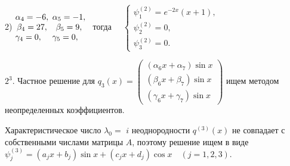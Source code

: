 \documentclass[11pt]{article}
\begin{document}
{\smallskip

2) $\begin{matrix} \alpha_4 = -6,\hfill\\ \beta_4 = 27,\\ \gamma_4 = 0,\hfill \end{matrix}$
$\begin{matrix} \alpha_5 = -1,\hfill\\ \beta_5 = 9,\\ \gamma_5 = 0,\hfill \end{matrix}$ \ 
тогда \ \ $\begin{cases} 
\psi_1^{(2)} = e^{-2x} (x+1), \\
\psi_2^{(2)} = 0, \\
\psi_3^{(2)} = 0.
\end{cases}$ 



\smallskip
$2^3.$ Частное решение для $q_3(x) = \begin{pmatrix} (\alpha_6 x + \alpha_7) \sin x \\ (\beta_6 x + \beta_7) \sin x \\ (\gamma_6 x + \gamma_7) \sin x \end{pmatrix}$ ищем методом неопределенных коэффициентов.

Характеристическое число $\lambda_0=$ $i$ неоднородности $q^{(3)}(x)$ не совпадает с собственными числами матрицы $A$, поэтому решение ищем в виде \\ $\psi_j^{(3)} = (a_j x + b_j) \sin x + (c_j x + d_j) \cos x \quad (j=1,2,3).$

}
\end{document}
